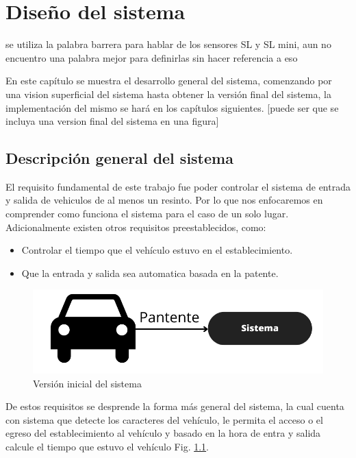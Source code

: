 \chapter{Diseño del sistema}

 {\huge se utiliza la palabra barrera para hablar de los sensores SL y SL mini, aun no encuentro una palabra mejor para definirlas sin hacer referencia a eso}

En este capítulo se muestra el desarrollo general del sistema, comenzando por una vision superficial del sistema hasta obtener la versión final del sistema, la implementación del mismo se hará en los capítulos siguientes. [puede ser que se incluya una version final del sistema en una figura]
\section{Descripción general del sistema}

El requisito fundamental de este trabajo fue poder controlar el sistema de entrada y salida de vehiculos de al menos un resinto. Por lo que nos enfocaremos en comprender como funciona el sistema para el caso de un solo lugar. Adicionalmente existen otros requisitos preestablecidos, como:

\begin{itemize}
    \item Controlar el tiempo que el vehículo estuvo en el establecimiento.
    \item Que la entrada y salida sea automatica basada en la patente.
\end{itemize}


\begin{figure}
    \centering
    \includegraphics[width=.8\textwidth]{imgs/sistema-base.png}
    \caption{Versión inicial del sistema}
    \label{fig:sistema-base}
\end{figure}

De estos requisitos se desprende la forma más general del sistema, la cual cuenta con sistema que detecte los caracteres del vehículo, le permita el acceso o el egreso del establecimiento al vehículo y basado en la hora de entra y salida calcule el tiempo que estuvo el vehículo Fig. \ref{fig:sistema-base}.


